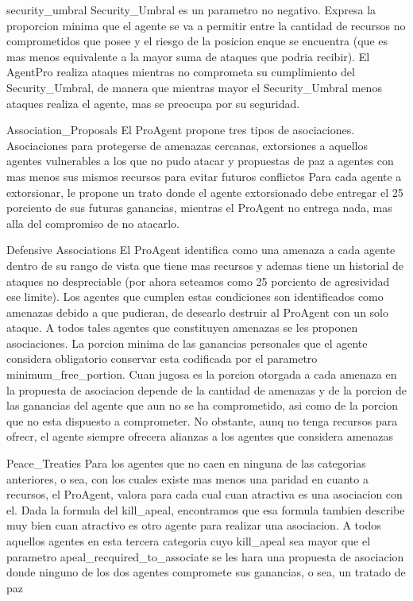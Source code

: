 \documentclass{beamer}
\begin{document}
\begin{frame}{security_umbral}
    Security_Umbral es un parametro no negativo.
    Expresa la proporcion minima que el agente se va a permitir entre la cantidad de recursos no comprometidos que posee y el riesgo de la posicion enque se encuentra (que es mas menos equivalente a la mayor suma de ataques que podria recibir).
    El AgentPro realiza ataques mientras no comprometa su cumplimiento del Security_Umbral, de manera que mientras mayor el Security_Umbral menos ataques realiza el agente, mas se preocupa por su seguridad.
\end{frame}

\begin{frame}{Association_Proposals}
    El ProAgent propone tres tipos de asociaciones. Asociaciones para protegerse de amenazas cercanas, extorsiones a aquellos agentes vulnerables a los que no pudo atacar y propuestas de paz a agentes con mas menos sus mismos recursos para evitar futuros conflictos
    Para cada agente a extorsionar, le propone un trato donde el agente extorsionado debe entregar el 25 porciento de sus futuras ganancias, mientras el ProAgent no entrega nada, mas alla del compromiso de no atacarlo.
\end{frame}

\begin{frame}{Defensive Associations}
    El ProAgent identifica como una amenaza a cada agente dentro de su rango de vista que tiene mas recursos y ademas tiene un historial de ataques no despreciable (por ahora seteamos como 25 porciento de agresividad ese limite). Los agentes que cumplen estas condiciones son identificados como amenazas debido a que pudieran, de desearlo destruir al ProAgent con un solo ataque.
    A todos tales agentes que constituyen amenazas se les proponen asociaciones. La porcion minima de las ganancias personales que el agente considera obligatorio conservar esta codificada por el parametro minimum_free_portion. Cuan jugosa es la porcion otorgada a cada amenaza en la propuesta de asociacion depende de la cantidad de amenazas y de la porcion de las ganancias del agente que aun no se ha comprometido, asi como de la porcion que no esta dispuesto a comprometer. No obstante, aunq no tenga recursos para ofrecr, el agente siempre ofrecera alianzas a los agentes que considera amenazas
\end{frame}

\begin{frame}{Peace_Treaties}
    Para los agentes que no caen en ninguna de las categorias anteriores, o sea, con los cuales existe mas menos una paridad en cuanto a recursos, el ProAgent, valora para cada cual cuan atractiva es una asociacion con el. Dada la formula del kill_apeal, encontramos que esa formula tambien describe muy bien cuan atractivo es otro agente para realizar una asociacion.
    A todos aquellos agentes en esta tercera categoria cuyo kill_apeal sea mayor que el parametro apeal_recquired_to_associate se les hara una propuesta de asociacion donde ninguno de los dos agentes compromete sus ganancias, o sea, un tratado de paz
\end{frame}
\end{document}
